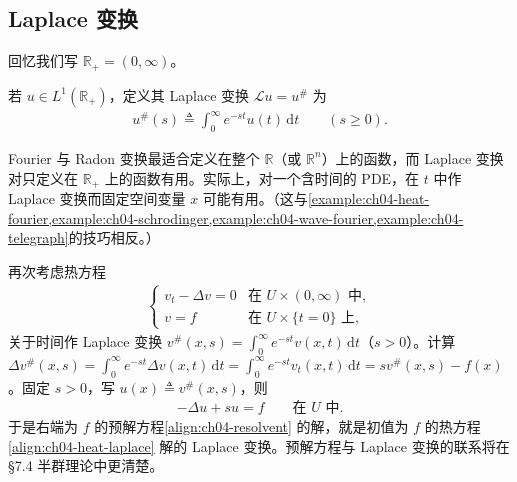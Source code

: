 \documentclass[../../main.tex]{subfiles}
\begin{document}
\subsection{Laplace 变换}\label{subsection:ch04-laplace}

回忆我们写 $\mathbb{R}_+=(0,\infty)$。

\begin{definition}\label{definition:ch04-laplace}
若 $u\in L^1(\mathbb{R}_+)$，定义其 Laplace 变换 $\mathcal{L}u=u^\#$ 为
\begin{align}\label{align:ch04-laplace-def}
u^\#(s)\triangleq\int_0^\infty e^{-st}u(t)\,\mathrm{d}t \qquad(s\geqslant 0).
\end{align}
\end{definition}

Fourier 与 Radon 变换最适合定义在整个 $\mathbb{R}$（或 $\mathbb{R}^n$）上的函数，而 Laplace 变换对只定义在 $\mathbb{R}_+$ 上的函数有用。实际上，对一个含时间的 PDE，在 $t$ 中作 Laplace 变换而固定空间变量 $x$ 可能有用。（这与\cref{example:ch04-heat-fourier,example:ch04-schrodinger,example:ch04-wave-fourier,example:ch04-telegraph}的技巧相反。）

\begin{example}\label{example:ch04-resolvent}再次考虑热方程
\begin{align}\label{align:ch04-heat-laplace}
\begin{cases}
v_t-\Delta v=0 & \text{在 }U\times(0,\infty)\text{ 中},\\
v=f & \text{在 }U\times\{t=0\}\text{ 上},
\end{cases}
\end{align}
关于时间作 Laplace 变换 $v^\#(x,s)=\int_0^\infty e^{-st}v(x,t)\,\mathrm{d}t$（$s>0$）。计算 $\Delta v^\#(x,s)=\int_0^\infty e^{-st}\Delta v(x,t)\,\mathrm{d}t=\int_0^\infty e^{-st}v_t(x,t)\,\mathrm{d}t=sv^\#(x,s)-f(x)$。固定 $s>0$，写 $u(x)\triangleq v^\#(x,s)$，则
\begin{align}\label{align:ch04-resolvent}
-\Delta u+su=f \qquad\text{在 }U\text{ 中}.
\end{align}
于是右端为 $f$ 的预解方程\eqref{align:ch04-resolvent} 的解，就是初值为 $f$ 的热方程\eqref{align:ch04-heat-laplace} 解的 Laplace 变换。预解方程与 Laplace 变换的联系将在 \S7.4 半群理论中更清楚。
\end{example}
\end{document}
